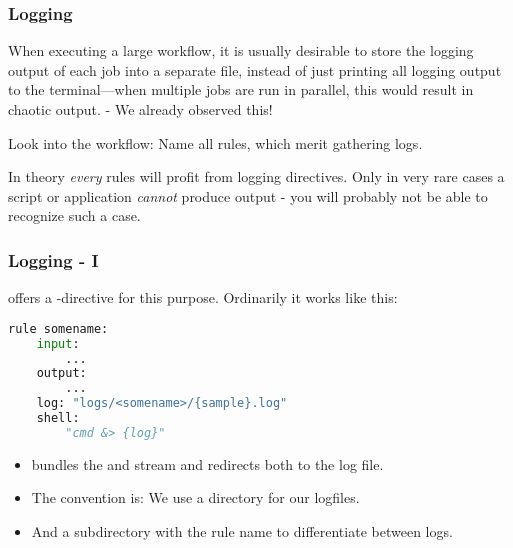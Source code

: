 \begin{frame}
  \frametitle{Logging}
  \begin{hint}
  	When executing a large workflow, it is usually desirable to store the logging output of each job into a separate file, instead of just printing all logging output to the terminal—when multiple jobs are run in parallel, this would result in chaotic output. - We already observed this!
  \end{hint}
  \pause
  \begin{task}
  	Look into the workflow: Name all rules, which merit gathering logs.
  \end{task}
  \pause
  \begin{docs}
  	In theory \emph{every} rules will profit from logging directives. Only in very rare cases a script or application \emph{cannot} produce output - you will probably not be able to recognize such a case.
  \end{docs}
\end{frame}


\begin{frame}[fragile]
	\frametitle{Logging - I}
	\Snakemake{} offers a -directive for this purpose. Ordinarily it works like this:
	\begin{lstlisting}[language=Python,style=Python]
rule somename:
    input:
        ...
    output:
        ...
    log: "logs/<somename>/{sample}.log"
    shell:
        "cmd &> {log}"
	\end{lstlisting}
	\begin{docs}\footnotesize
		\begin{itemize}[<+->]
			\item \altverb{&} bundles the  and  stream and \altverb{>} redirects both to the log file.
			\item The convention is: We use a directory  for our logfiles.
			\item And a subdirectory with the rule name to differentiate between logs.
		\end{itemize} 
	\end{docs}
\end{frame}


